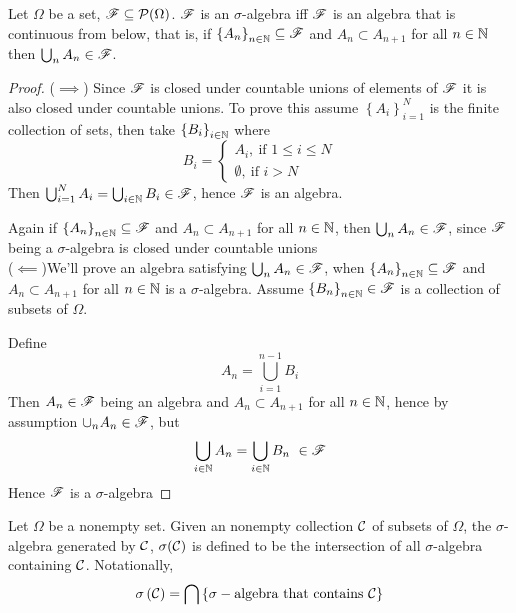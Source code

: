 \begin{proposition}
    Let $\Omega$ be a set, ${\mathscr F} \subseteq {\cal P} (\Omega )$. ${\mathscr F}$ is an $\sigma$-algebra iff ${\mathscr F}$ is an algebra that is continuous from below, that is, if $\left\{ A_n \right\}_{n\in \mathbb N} \subseteq {\mathscr F}$ and $A_n \subset A_{n+1}$ for all $n\in \mathbb N$ then $\bigcup _n A_n \in {\mathscr F}$.
\end{proposition}

\begin{proof}
    ($\implies$) Since ${\mathscr F}$ is closed under countable unions of elements of ${\mathscr F}$ it is also closed under countable unions. To prove this assume $\left\{ A_i \right\}_{i=1}^{N}$ is the finite collection of sets, then take $\left\{ B_i \right\}_{i \in \mathbb N}$ where
    \begin{equation*}
        B_i = 
        \begin{cases}
            A_i, \ \text{if } 1 \le i \le N \\
            \emptyset, \ \text{if } i > N
        \end{cases}
    \end{equation*}
    Then $\bigcup_{i=1}^N A_i = \bigcup_{i \in \mathbb N} B_i \in {\mathscr F}$, hence ${\mathscr F}$ is an algebra. 

    Again if $\left\{ A_n \right\}_{n\in \mathbb N} \subseteq {\mathscr F}$ and $A_n \subset A_{n+1}$ for all $n\in \mathbb N$, then $\bigcup _n A_n \in {\mathscr F}$, since ${\mathscr F}$ being a $\sigma$-algebra is closed under countable unions \\


    ($\impliedby$)We'll prove an algebra satisfying $\bigcup _n A_n \in {\mathscr F}$, when $\left\{ A_n \right\}_{n\in \mathbb N} \subseteq {\mathscr F}$ and $A_n \subset A_{n+1}$ for all $n\in \mathbb N$ is a $\sigma$-algebra.
    Assume $\left\{ B_n \right\}_{n\in \mathbb N} \in {\mathscr F}$ is a collection of subsets of $\Omega$.

    Define
       $$ A_n = \bigcup_{i = 1}^{n-1}B_i $$
    Then $A_n \in {\mathscr F}$ being an algebra and $A_n \subset A_{n+1}$ for all $n \in \mathbb N$, hence by assumption $\cup_n A_n \in {\mathscr F}$, but
       $$
           \bigcup_{i \in \mathbb N} A_n  =  \bigcup_{i \in \mathbb N} B_n \ \in {\mathscr F}
       $$
    Hence ${\mathscr F}$ is a $\sigma$-algebra
\end{proof}

\begin{definition}
    Let $\Omega$ be a nonempty set. Given an nonempty collection ${\cal C}$ of subsets of $\Omega$, the $\sigma$-algebra generated by ${\cal C}$, $\sigma ({\cal C})$ is defined to be the intersection of all $\sigma$-algebra containing ${\cal C}$. Notationally,
    $$\sigma \left( {\cal C} \right) = \bigcap \left\{ \sigma-\text{algebra that contains  }{\cal C} \right\}$$
    \label{def:generated-sigma-algebra}
\end{definition}

